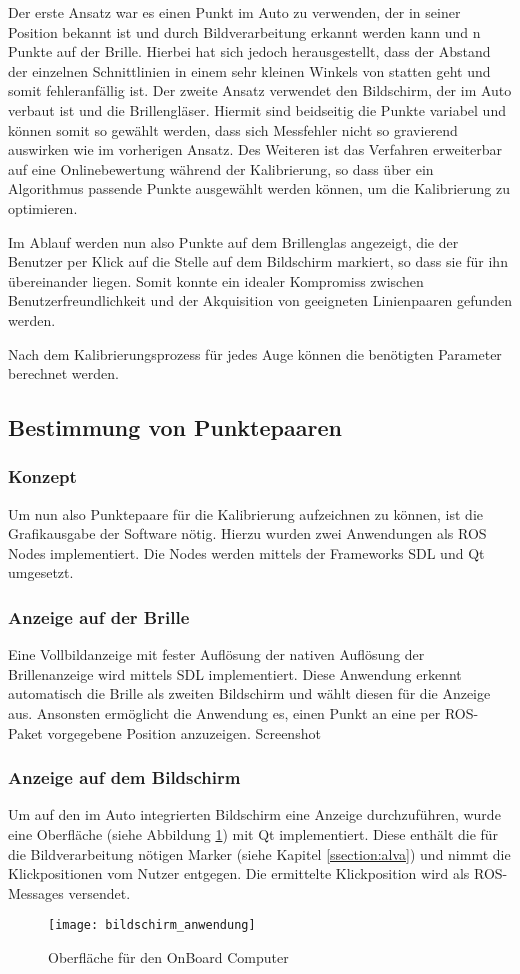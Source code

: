 Der erste Ansatz war es einen Punkt im Auto zu verwenden, der in seiner Position bekannt ist und durch Bildverarbeitung erkannt werden kann und n Punkte auf der Brille. Hierbei hat sich jedoch herausgestellt, dass der Abstand der einzelnen Schnittlinien in einem sehr kleinen Winkels von statten geht und somit fehleranfällig ist. Der zweite Ansatz verwendet den Bildschirm, der im Auto verbaut ist und die Brillengläser. Hiermit sind beidseitig die Punkte variabel und können somit so gewählt werden, dass sich Messfehler nicht so gravierend auswirken wie im vorherigen Ansatz. Des Weiteren ist das Verfahren erweiterbar auf eine Onlinebewertung während der Kalibrierung, so dass über ein Algorithmus passende Punkte ausgewählt werden können, um die Kalibrierung zu optimieren.

Im Ablauf werden nun also Punkte auf dem Brillenglas angezeigt, die der Benutzer per Klick auf die Stelle auf dem Bildschirm markiert, so dass sie für ihn übereinander liegen. Somit konnte ein idealer Kompromiss zwischen Benutzerfreundlichkeit und der Akquisition von geeigneten Linienpaaren gefunden werden.

Nach dem Kalibrierungsprozess für jedes Auge können die benötigten Parameter berechnet werden.


\subsection{Bestimmung von Punktepaaren}
\label{chap:punktepaare}
\subsubsection{Konzept}
Um nun also Punktepaare für die Kalibrierung aufzeichnen zu können, ist die Grafikausgabe der Software nötig. Hierzu wurden zwei Anwendungen als ROS Nodes implementiert. Die Nodes werden mittels der Frameworks SDL und Qt umgesetzt.
\subsubsection{Anzeige auf der Brille}
Eine Vollbildanzeige mit fester Auflösung der nativen Auflösung der Brillenanzeige wird mittels SDL implementiert. Diese Anwendung erkennt automatisch die Brille als zweiten Bildschirm und wählt diesen für die Anzeige aus. Ansonsten ermöglicht die Anwendung es, einen Punkt an eine per ROS-Paket vorgegebene Position anzuzeigen.
Screenshot
\subsubsection{Anzeige auf dem Bildschirm}
Um auf den im Auto integrierten Bildschirm eine Anzeige durchzuführen, wurde eine Oberfläche (siehe Abbildung \ref{fig:fensteranwendung}) mit Qt implementiert. Diese enthält die für die Bildverarbeitung nötigen Marker (siehe Kapitel \ref{ssection:alva}) und nimmt die Klickpositionen vom Nutzer entgegen. Die ermittelte Klickposition wird als ROS-Messages versendet.
\begin{figure}[h]
   \centering
   \texttt{[image: bildschirm\_anwendung]}
   \caption{Oberfläche für den OnBoard Computer}
   \label{fig:fensteranwendung}
\end{figure}


